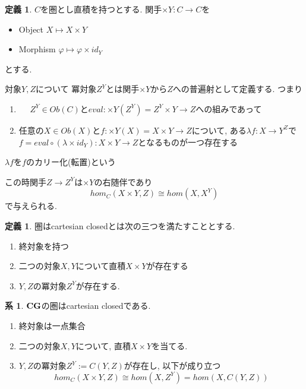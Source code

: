\documentclass[dvipdfmx,a4paper,11pt]{article}
\theoremstyle{definition}
\newtheorem{cor}[thm]{系}
\newtheorem{dfn}[thm]{定義}
\begin{document}
 \begin{tcolorbox}
 [colback = white, colframe = green!35!black, fonttitle = \bfseries,breakable = true]
\begin{dfn}
 $C$を圏とし直積を持つとする. 
 関手$\times Y : C \to C$を
 \begin{itemize}
 \item Object $X \mapsto X \times Y$
 \item Morphism $\varphi \mapsto \varphi \times  id_{Y}$
 \end{itemize}
 とする.

対象$Y,Z$について
 冪対象$Z^Y$とは関手$ \times Y$から$Z$への普遍射として定義する. 
つまり
 \begin{enumerate}
 \item　 $Z^Y \in Ob(C)$と$eval : \times Y(Z^Y) = Z^Y \times Y \to Z$への組みであって
 \item 任意の$X \in Ob(X)$と$f: \times Y(X) = X \times Y \to Z$について, ある$\lambda f : X \to Y^{Z}$で$f = eval \circ (\lambda \times id_Y) : X \times Y \to Z$となるものが一つ存在する
 \end{enumerate}
$\lambda f$を$f$のカリー化(転置)という

この時関手$Z \to Z^Y$は$\times Y$の右随伴であり
$$
hom_C(X \times Y, Z) \cong hom(X,X^Y)
$$
で与えられる. 
\end{dfn}
\end{tcolorbox}

 \begin{tcolorbox}
 [colback = white, colframe = green!35!black, fonttitle = \bfseries,breakable = true]


\begin{dfn}
圏はcartesian closedとは次の三つを満たすこととする. 
\begin{enumerate}
\item 終対象を持つ
\item 二つの対象$X,Y$について直積$X \times Y$が存在する
\item $Y,Z$の冪対象$Z^Y$が存在する. 
\end{enumerate}
\end{dfn}
\end{tcolorbox}

 \begin{tcolorbox}
 [colback = white, colframe = green!35!black, fonttitle = \bfseries,breakable = true]
\begin{cor}\cite[Prop2.１2]{Str}
${\bf CG}$の圏はcartesian closedである. 
\begin{enumerate}
\item 終対象は一点集合
\item 二つの対象$X,Y$について, 直積$X \times Y$を当てる. 
\item $Y,Z$の冪対象$Z^Y :=C(Y,Z)$が存在し, 以下が成り立つ
$$
hom_C(X \times Y, Z) \cong hom(X,Z^Y)=hom(X,C(Y,Z))
$$
\end{enumerate}
\end{cor}
\end{tcolorbox}
\end{document}
